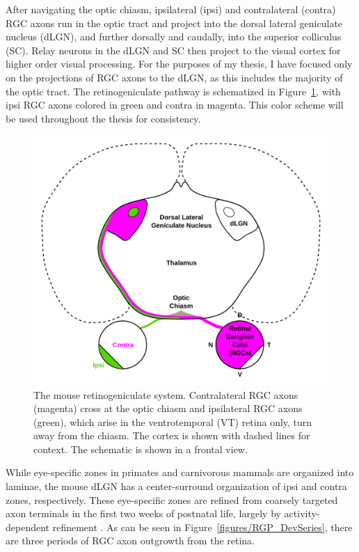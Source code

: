 After navigating the optic chiasm, ipsilateral (ipsi) and contralateral (contra) RGC axons run in the optic tract and project into the dorsal lateral geniculate nucleus (dLGN), and further dorsally and caudally, into the superior colliculus (SC).
Relay neurons in the dLGN and SC then project to the visual cortex for higher order visual processing.
For the purposes of my thesis, I have focused only on the projections of RGC axons to the dLGN, as this includes the majority of the optic tract.
The retinogeniculate pathway is schematized in Figure~\ref{figures/RGP_Schema}, with ipsi RGC axons colored in green and contra in magenta.
This color scheme will be used throughout the thesis for consistency.
\begin{figure}[hbtp]
\begin{center}
\includegraphics[width=\textwidth]{figures/RGP_Schema.svg}
\caption{The mouse retinogeniculate system. Contralateral RGC axons (magenta) cross at the optic chiasm and ipsilateral RGC axons (green), which arise in the ventrotemporal (VT) retina only, turn away from the chiasm. The cortex is shown with dashed lines for context. The schematic is shown in a frontal view.}
\label{figures/RGP_Schema}
\end{center}
\end{figure}

While eye-specific zones in primates and carnivorous mammals are organized into laminae, the mouse dLGN has a center-surround organization of ipsi and contra zones, respectively.
These eye-specific zones are refined from coarsely targeted axon terminals in the first two weeks of postnatal life, largely by activity-dependent refinement \cite{huberman2008mechanisms,feldheim2010visual}.
As can be seen in Figure~\ref{figures/RGP_DevSeries}, there are three periods of RGC axon outgrowth from the retina.


